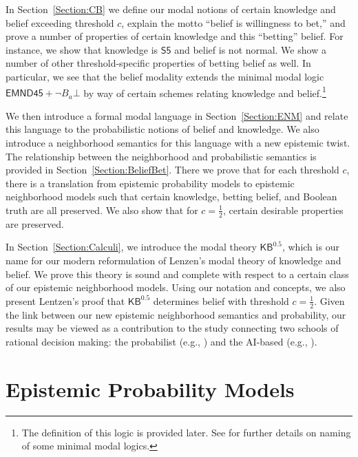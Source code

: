 \documentclass[12pt]{article}
\theoremstyle{definition}
\newcommand{\KBeq}{{\mathsf{KB}^{\mathsf{0.5}}}}       %
\begin{document}
In Section~\ref{Section:CB} we define our modal notions of certain
knowledge and belief exceeding threshold $c$, explain the motto
``belief is willingness to bet,'' and prove a number of properties of
certain knowledge and this ``betting'' belief.  For instance, we show
that knowledge is $\mathsf{S5}$ and belief is not normal.  We show a
number of other threshold-specific properties of betting belief as
well.  In particular, we see that the belief modality extends the
minimal modal logic $\mathsf{EMND45}+\lnot B_a\bot$ by way of certain
schemes relating knowledge and belief.\footnote{The definition of this
  logic is provided later. See \cite[Ch.~8]{Chellas:ml} for further
  details on naming of some minimal modal logics.}

We then introduce a formal modal language in Section~\ref{Section:ENM}
and relate this language to the probabilistic notions of belief and
knowledge.  We also introduce a neighborhood semantics for this
language with a new epistemic twist.  The relationship between the
neighborhood and probabilistic semantics is provided in
Section~\ref{Section:BeliefBet}.  There we prove that for each
threshold $c$, there is a translation from epistemic probability
models to epistemic neighborhood models such that certain knowledge,
betting belief, and Boolean truth are all preserved.  We also show
that for $c=\frac 12$, certain desirable properties are preserved.

In Section~\ref{Section:Calculi}, we introduce the modal theory
$\KBeq$, which is our name for our modern reformulation of Lenzen's
modal theory of knowledge and belief.  We prove this theory is sound
and complete with respect to a certain class of our epistemic
neighborhood models.  Using our notation and concepts, we also present
Lentzen's proof \cite{Lenzen1980:gwuw} that $\KBeq$ determines belief
with threshold $c=\frac 12$.  Given the link between our new epistemic
neighborhood semantics and probability, our results may be viewed as a
contribution to the study connecting two schools of rational decision
making: the probabilist (e.g., \cite{koerner2008naive}) and the
AI-based (e.g., \cite{KyburgTeng2012:tlorkr}).


\section{Epistemic Probability Models}
\label{Section:EPL} 
\end{document}
